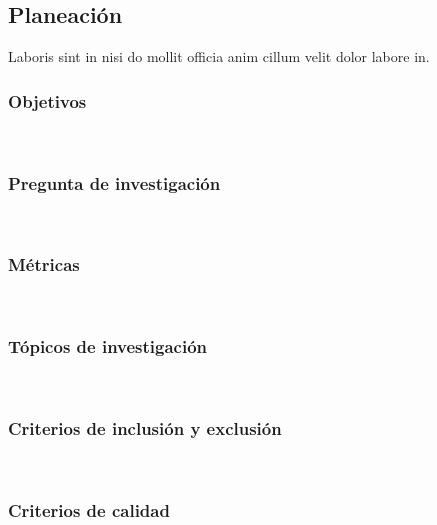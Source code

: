 \subsection{Planeación}
Laboris sint in nisi do mollit officia anim cillum velit dolor labore in.



\subsubsection{Objetivos}
\mbox{}\\

\subsubsection{Pregunta de investigación}
\mbox{}\\

\subsubsection{Métricas}
\mbox{}\\

\subsubsection{Tópicos de investigación}
\mbox{}\\

\subsubsection{Criterios de inclusión y exclusión}
\mbox{}\\

\subsubsection{Criterios de calidad}
\mbox{}\\
